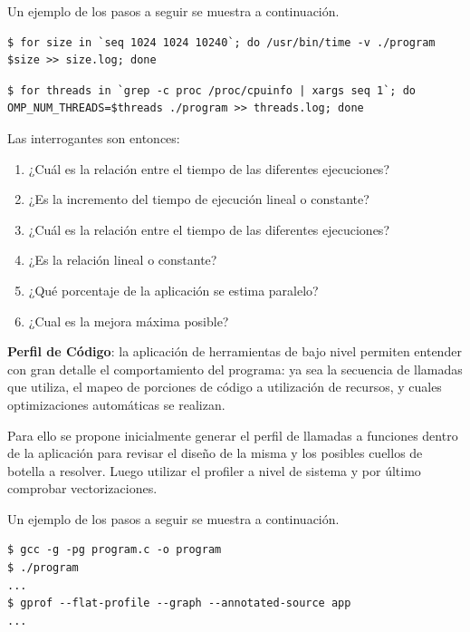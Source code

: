 \documentclass[a4paper]{report}
\begin{document}
\bigskip

Un ejemplo de los pasos a seguir se muestra a continuación.

\begin{lstlisting}[caption={Escalamiento de Problema},label={lst:size}]
$ for size in `seq 1024 1024 10240`; do /usr/bin/time -v ./program $size >> size.log; done
\end{lstlisting}

\begin{lstlisting}[caption={Escalamiento de Cómputo},label={lst:proc}]
$ for threads in `grep -c proc /proc/cpuinfo | xargs seq 1`; do OMP_NUM_THREADS=$threads ./program >> threads.log; done
\end{lstlisting}

Las interrogantes son entonces:

\begin{enumerate}
\item ¿Cuál es la relación entre el tiempo de las diferentes ejecuciones?
\item ¿Es la incremento del tiempo de ejecución lineal o constante?
\item ¿Cuál es la relación entre el tiempo de las diferentes ejecuciones?
\item ¿Es la relación lineal o constante?
\item ¿Qué porcentaje de la aplicación se estima paralelo?
\item ¿Cual es la mejora máxima posible?
\end{enumerate}

\bigskip

{\bf Perfil de Código}: la aplicación de herramientas de bajo nivel permiten entender con gran detalle el comportamiento del programa: ya sea la secuencia de llamadas que utiliza, el mapeo de porciones de código a utilización de recursos, y cuales optimizaciones automáticas se realizan.

\bigskip

Para ello se propone inicialmente generar el perfil de llamadas a funciones dentro de la aplicación para revisar el diseño de la misma y los posibles cuellos de botella a resolver. Luego utilizar el profiler a nivel de sistema y por último comprobar vectorizaciones.

\bigskip

Un ejemplo de los pasos a seguir se muestra a continuación.

\begin{lstlisting}[caption={Generación de Perfil de Rendimiento},label={lst:gprofall}]
$ gcc -g -pg program.c -o program
$ ./program
...
$ gprof --flat-profile --graph --annotated-source app
...
\end{lstlisting}
\end{document}
